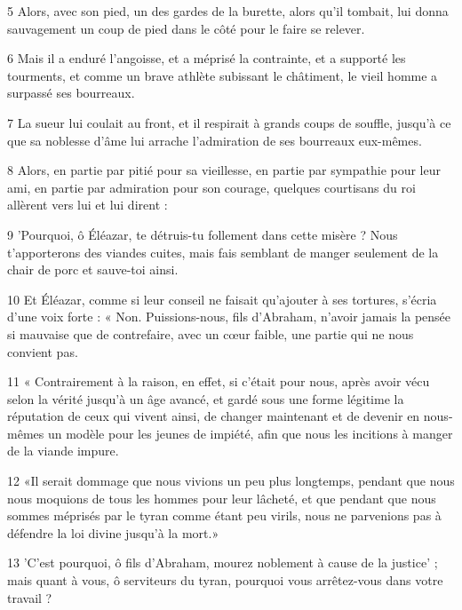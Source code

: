 \par 5 Alors, avec son pied, un des gardes de la burette, alors qu'il tombait, lui donna sauvagement un coup de pied dans le côté pour le faire se relever.

\par 6 Mais il a enduré l'angoisse, et a méprisé la contrainte, et a supporté les tourments, et comme un brave athlète subissant le châtiment, le vieil homme a surpassé ses bourreaux.

\par 7 La sueur lui coulait au front, et il respirait à grands coups de souffle, jusqu'à ce que sa noblesse d'âme lui arrache l'admiration de ses bourreaux eux-mêmes.

\par 8 Alors, en partie par pitié pour sa vieillesse, en partie par sympathie pour leur ami, en partie par admiration pour son courage, quelques courtisans du roi allèrent vers lui et lui dirent :

\par 9 'Pourquoi, ô Éléazar, te détruis-tu follement dans cette misère ? Nous t'apporterons des viandes cuites, mais fais semblant de manger seulement de la chair de porc et sauve-toi ainsi.

\par 10 Et Éléazar, comme si leur conseil ne faisait qu'ajouter à ses tortures, s'écria d'une voix forte : « Non. Puissions-nous, fils d'Abraham, n'avoir jamais la pensée si mauvaise que de contrefaire, avec un cœur faible, une partie qui ne nous convient pas.

\par 11 « Contrairement à la raison, en effet, si c'était pour nous, après avoir vécu selon la vérité jusqu'à un âge avancé, et gardé sous une forme légitime la réputation de ceux qui vivent ainsi, de changer maintenant et de devenir en nous-mêmes un modèle pour les jeunes de impiété, afin que nous les incitions à manger de la viande impure.

\par 12 «Il serait dommage que nous vivions un peu plus longtemps, pendant que nous nous moquions de tous les hommes pour leur lâcheté, et que pendant que nous sommes méprisés par le tyran comme étant peu virils, nous ne parvenions pas à défendre la loi divine jusqu'à la mort.»

\par 13 'C'est pourquoi, ô fils d'Abraham, mourez noblement à cause de la justice' ; mais quant à vous, ô serviteurs du tyran, pourquoi vous arrêtez-vous dans votre travail ?

